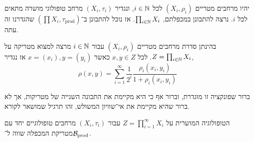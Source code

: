 \begin{example}
	יהיו מרחבים מטריים $(X_i, \rho_i)$ לכל $i \in \mathbb{N}$, ונגדיר $(X_i, \tau_i)$ מרחב טופולוגי מושרה מתאים לכל $i$.
	נרצה להתבונן במכפלתם, $\prod_{i \in \mathbb{N}} X_i$.
	אז נוכל להתבונן ב־$(\prod X_i, \tau_{\text{prod}})$ שהגדרנו זה עתה.
\end{example}
\begin{definition}
	בהינתן סדרת מרחבים מטריים $(X_i, \rho_i)$ עבור $i \in \mathbb{N}$ מרצה למצוא מטריקה על $Z = \prod_{i \in \mathbb{N}} X_i$.
	לכל $x, y \in Z$ כאשר $x = (x_i), y = (y_i)$ אז נגדיר,
	\[
		\rho(x, y)
		= \sum_{i = 1}^{\infty} \frac{1}{2^i} \frac{\rho_i(x_i, y_i)}{1 + \rho_i(x_i, y_i)}
	\]
\end{definition}
ברור שפונקציה זו מוגדרת, וברור אף כי היא מקיימת את התכונה השנייה של מטריקות, אך לא ברור שהיא מקיימת את אי־שוויון המשולש, זהו תרגיל שמושאר לקורא.
\begin{proposition}
	הטופולוגיה המושרית על $Z = \prod_{i = 1}^\infty X_i$ עבור $(X_i, \tau_i)$ מרחבים טופולוגיים יחד עם מטריקת המכפלה שווה ל־$\mathcal{B}_{\text{prod}}$.
\end{proposition}
